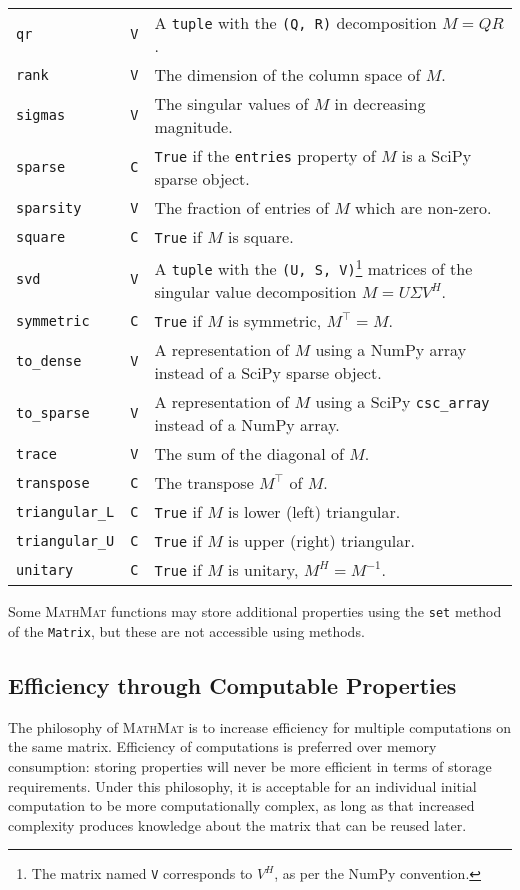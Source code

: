 \documentclass[12pt,a4paper]{article}
\newcommand{\mathmat}{\textsc{MathMat} }
\newcommand{\ct}[1]{\texttt{#1}}
\begin{document}
\begin{longtable}[c]{p{3.5cm}|p{1.25cm}|p{9cm}}
\ct{qr} & \ct{V} & A \ct{tuple} with the \ct{(Q, R)} decomposition $M = QR$. \\ 
\ct{rank} & \ct{V} & The dimension of the column space of $M$. \\
\ct{sigmas} & \ct{V} & The singular values of $M$ in decreasing magnitude. \\
\ct{sparse} & \ct{C} & \ct{True} if the \ct{entries} property of $M$ is a SciPy sparse object. \\
\ct{sparsity} & \ct{V} & The fraction of entries of $M$ which are non-zero. \\
\ct{square} & \ct{C} & \ct{True} if $M$ is square. \\
\ct{svd} & \ct{V} & A \ct{tuple} with the \ct{(U, S, V)}\footnote{The matrix named \ct{V} corresponds to $V^H$, as per the NumPy convention.} matrices of the singular value decomposition $M = U \Sigma V^H$. \\
\ct{symmetric} & \ct{C} & \ct{True} if $M$ is symmetric, $M^\top  = M$. \\
\ct{to\_dense} & \ct{V} & A representation of $M$ using a NumPy array instead of a SciPy sparse object. \\
\ct{to\_sparse} & \ct{V} & A representation of $M$ using a SciPy \ct{csc\_array} instead of a NumPy array. \\
\ct{trace} & \ct{V} & The sum of the diagonal of $M$. \\
\ct{transpose} & \ct{C} & The transpose $M^\top$ of $M$. \\
\ct{triangular\_L} & \ct{C} & \ct{True} if $M$ is lower (left) triangular. \\
\ct{triangular\_U} & \ct{C} & \ct{True} if $M$ is upper (right) triangular. \\
\ct{unitary} & \ct{C} & \ct{True} if $M$ is unitary, $M^H = M^{-1}$. \\ \hline
\end{longtable}
\noindent Some \mathmat functions may store additional properties using the \ct{set} method of the \ct{Matrix}, but these are not accessible using methods.

\subsection{Efficiency through Computable Properties}

The philosophy of \mathmat is to increase efficiency for multiple computations on the same matrix. Efficiency of computations is preferred over memory consumption: storing properties will never be more efficient in terms of storage requirements. Under this philosophy, it is acceptable for an individual initial computation to be more computationally complex, as long as that increased complexity produces knowledge about the matrix that can be reused later.
\end{document}
